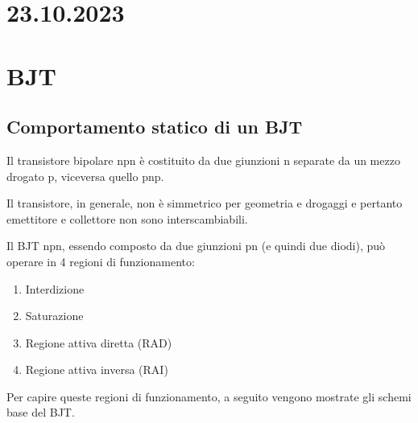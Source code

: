 \section{23.10.2023}
\section{BJT}
\subsection{Comportamento statico di un BJT}
Il transistore bipolare npn è costituito da due giunzioni n separate da un mezzo drogato p, viceversa quello pnp.\\

%
\noindent\begin{minipage}{0.7\textwidth}
    Il transistore, in generale, non è simmetrico per geometria e drogaggi e pertanto emettitore e collettore non sono interscambiabili.\\
\end{minipage}
\hfill
\begin{minipage}{0.29\textwidth}\raggedleft
\end{minipage}
%
Il BJT npn, essendo composto da due giunzioni pn (e quindi due diodi), può operare in 4 regioni di funzionamento:
\begin{enumerate}
    \item Interdizione
    \item Saturazione
    \item Regione attiva diretta (RAD)
    \item Regione attiva inversa (RAI)
\end{enumerate}
Per capire queste regioni di funzionamento, a seguito vengono mostrate gli schemi base del BJT.\\
\vspace{5mm}
